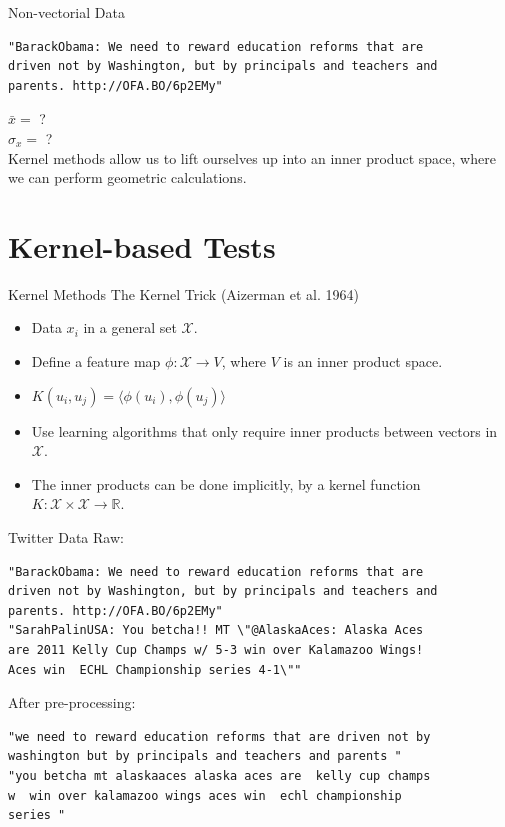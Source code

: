 \documentclass{beamer}
\begin{document}
\begin{frame}[fragile]{Non-vectorial Data}
\begin{verbatim}
"BarackObama: We need to reward education reforms that are
driven not by Washington, but by principals and teachers and
parents. http://OFA.BO/6p2EMy"
\end{verbatim}
\pause

$\bar{x} = $ ? \\ \pause
$\hat{\sigma}_x = $ ? \\ \pause
Kernel methods allow us to lift ourselves up into an inner product space, where we can perform geometric calculations.
\end{frame}

\section{Kernel-based Tests}
\begin{frame}{Kernel Methods}
  The Kernel Trick (Aizerman et al. 1964) \pause
  \begin{itemize}
  \item Data $x_i$ in a general set $\mathcal{X}$. \pause
  \item Define a feature map $\phi : \mathcal{X} \to V$, where $V$ is an inner product space. \pause
  \item $K(u_i, u_j) = \langle \phi(u_i), \phi(u_j) \rangle$ \pause
  \item Use learning algorithms that only require inner products between vectors in $\mathcal{X}$. \pause
  \item The inner products can be done implicitly, by a kernel function $K: \mathcal{X} \times \mathcal{X} \to \mathbb{R}$.
  \end{itemize}
\end{frame}

\begin{frame}[fragile]{Twitter Data}
  Raw:
\begin{verbatim}
"BarackObama: We need to reward education reforms that are
driven not by Washington, but by principals and teachers and
parents. http://OFA.BO/6p2EMy"
"SarahPalinUSA: You betcha!! MT \"@AlaskaAces: Alaska Aces
are 2011 Kelly Cup Champs w/ 5-3 win over Kalamazoo Wings!
Aces win  ECHL Championship series 4-1\""
\end{verbatim}
  After pre-processing:
\begin{verbatim}
"we need to reward education reforms that are driven not by
washington but by principals and teachers and parents "
"you betcha mt alaskaaces alaska aces are  kelly cup champs
w  win over kalamazoo wings aces win  echl championship
series "
\end{verbatim}
\end{frame}
\end{document}
